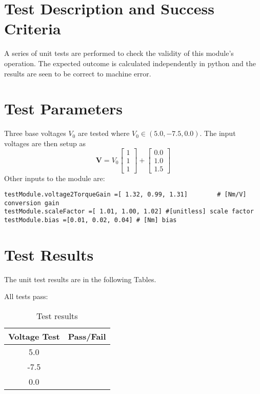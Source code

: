 \section{Test Description and Success Criteria}
A series of unit tests are performed to check the validity of this module's operation.  The expected outcome is calculated independently in python and the results are seen to be correct to machine error.

\section{Test Parameters}
Three base voltages $V_{0}$  are tested where $V_{0} \in (5.0, -7.5, 0.0)$.    The input voltages are then setup as 
\begin{equation}
\bm V = V_{0} \begin{bmatrix} 1 \\ 1 \\ 1 \end{bmatrix}
+ \begin{bmatrix} 0.0 \\ 1.0 \\ 1.5 \end{bmatrix}
\end{equation} 
Other inputs to the module are:
\begin{verbatim}
testModule.voltage2TorqueGain =[ 1.32, 0.99, 1.31]        # [Nm/V] conversion gain 
testModule.scaleFactor =[ 1.01, 1.00, 1.02] #[unitless] scale factor
testModule.bias =[0.01, 0.02, 0.04]	# [Nm] bias
\end{verbatim}

\section{Test Results}
The unit test results are in the following Tables.  





All tests pass:
\begin{table}[H]
	\caption{Test results}
	\label{tab:results}
	\centering \fontsize{10}{10}\selectfont
	\begin{tabular}{c | c  } %
		\hline
		\textbf{Voltage Test} 						  		&\textbf{Pass/Fail} \\ \hline
		5.0	   			&  \\ \hline
		-7.5	   			&  \\ \hline
		0.0	   			&  \\ \hline
	\end{tabular}
\end{table}
